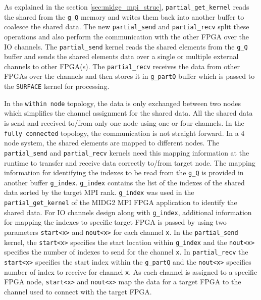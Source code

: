 As explained in the section \ref{sec:midge_mpi_struc}, \texttt{partial\_get\_kernel} reads
the shared from the \texttt{g\_Q} memory and writes them back into another buffer
to coalesce the shared data. The new \texttt{partial\_send} and \texttt{partial\_recv}
split these operations and also perform the communication with the
other FPGA over the IO channels. The \texttt{partial\_send} kernel reads the
shared elements from the \texttt{g\_Q} buffer and sends the shared elements data
over a single or multiple external channels to other FPGA(s).
The \texttt{partial\_recv} receives the data from other FPGAs over the channels and
then stores it in \texttt{g\_partQ} buffer which is passed to the \texttt{SURFACE}
kernel for processing.

In the \texttt{within node} topology, the data is only exchanged between two nodes
which simplifies the channel assignment for the shared data. All the shared data is send and received
to/from only one node using one or four channels. In the \texttt{fully connected} topology,
the communication is not straight forward. In a 4 node system, the shared elements are mapped
to different nodes. The \texttt{partial\_send} and \texttt{partial\_recv} kernels need this mapping
information at the runtime to transfer and receive data correctly to/from target node. The mapping information
for identifying the indexes to be read from the \texttt{g\_Q} is provided in another buffer
\texttt{g\_index}. \texttt{g\_index} contains the list of the indexes of the shared data
sorted by the target \ac{MPI} rank. \texttt{g\_index} was used in the \texttt{partial\_get\_kernel}
of the MIDG2 \ac{MPI} FPGA application to identify the shared data. For IO channels design along with
\texttt{g\_index}, additional information for mapping the indexes to specific target FPGA is
passed by using two parameters \texttt{start<x>} and \texttt{nout<x>} for each channel \texttt{x}.
In the \texttt{partial\_send} kernel, the \texttt{start<x>} specifies the start location within \texttt{g\_index}
and the \texttt{nout<x>} specifies the number of indexes to send for the channel \texttt{x}. In
\texttt{partial\_recv} the \texttt{start<x>} specifies the start index within the \texttt{g\_partQ}
and the \texttt{nout<x>} specifies number of index to receive for channel \texttt{x}. As each
channel is assigned to a specific FPGA node, \texttt{start<x>} and \texttt{nout<x>} map
the data for a target FPGA to the channel used to connect with the target FPGA.

